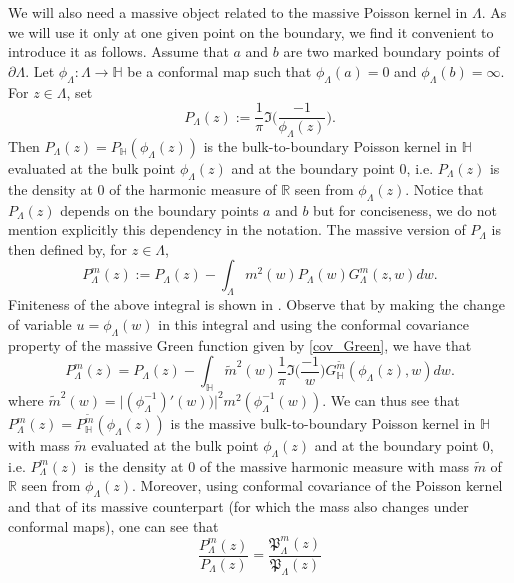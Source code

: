 \documentclass{article}
\newcommand{\HH}{{\mathbb{H}}}
\theoremstyle{definition}
\theoremstyle{remark}
\theoremstyle{remark}
\begin{document}
We will also need a massive object related to the massive Poisson kernel in $\Lambda$. As we will use it only at one given point on the boundary, we find it convenient to introduce it as follows. Assume that $a$ and $b$ are two marked boundary points of $\partial \Lambda$. Let $\phi_{\Lambda}: \Lambda \to \mathbb{H}$ be a conformal map such that $\phi_{\Lambda}(a)=0$ and $\phi_{\Lambda}(b)=\infty$. For $z \in \Lambda$, set
\begin{equation} \label{P_lambda}
    P_{\Lambda}(z) := \frac{1}{\pi}\Im \bigg( \frac{-1}{\phi_{\Lambda}(z)}\bigg).
\end{equation}
Then $P_{\Lambda}(z)=P_{\HH}(\phi_\Lambda(z))$ is the bulk-to-boundary Poisson kernel in $\HH$ evaluated at the bulk point $\phi_{\Lambda}(z)$ and at the boundary point $0$, i.e. $P_{\Lambda}(z)$ is the density at $0$ of the harmonic measure of $\mathbb{R}$ seen from $\phi_{\Lambda}(z)$. Notice that $P_{\Lambda}(z)$ depends on the boundary points $a$ and $b$ but for conciseness, we do not mention explicitly this dependency in the notation. The massive version of $P_{\Lambda}$ is then defined by, for $z \in \Lambda$, 
\begin{equation} \label{Pm_lambda}
    P_{\Lambda}^m(z) := P_{\Lambda}(z) - \int_{\Lambda} m^2(w)P_{\Lambda}(w)G_{\Lambda}^m(z,w)dw .
\end{equation}
Finiteness of the above integral is shown in \cite[Equation~(4.6)]{mLERW}. Observe that by making the change of variable $u=\phi_{\Lambda}(w)$ in this integral and using the conformal covariance property of the massive Green function given by \eqref{cov_Green}, we have that
\begin{equation*}
    P_{\Lambda}^m(z) = P_{\Lambda}(z) - \int_{\HH} \tilde m^2(w)\frac{1}{\pi}\Im \bigg( \frac{-1}{w}\bigg) G_{\HH}^{\tilde m}(\phi_{\Lambda}(z),w)dw .
\end{equation*}
where $\tilde m^2(w) = \vert (\phi_{\Lambda}^{-1})'(w)) \vert^2 m^2(\phi_{\Lambda}^{-1}(w))$. We can thus see that $P_{\Lambda}^m(z)=P_{\HH}^{\tilde m}(\phi_\Lambda(z))$ is the massive bulk-to-boundary Poisson kernel in $\HH$ with mass $\tilde m$ evaluated at the bulk point $\phi_{\Lambda}(z)$ and at the boundary point $0$, i.e. $P_{\Lambda}^m(z)$ is the density at $0$ of the massive harmonic measure with mass $\tilde m$ of $\mathbb{R}$ seen from $\phi_{\Lambda}(z)$. Moreover, using conformal covariance of the Poisson kernel and that of its massive counterpart (for which the mass also changes under conformal maps), one can see that
\begin{equation} \label{ratio_P_Pm}
    \frac{P_{\Lambda}^m(z)}{P_{\Lambda}(z)} = \frac{\mathfrak{P}_{\Lambda}^m(z)}{\mathfrak{P}_{\Lambda}(z)}
\end{equation}
\end{document}
